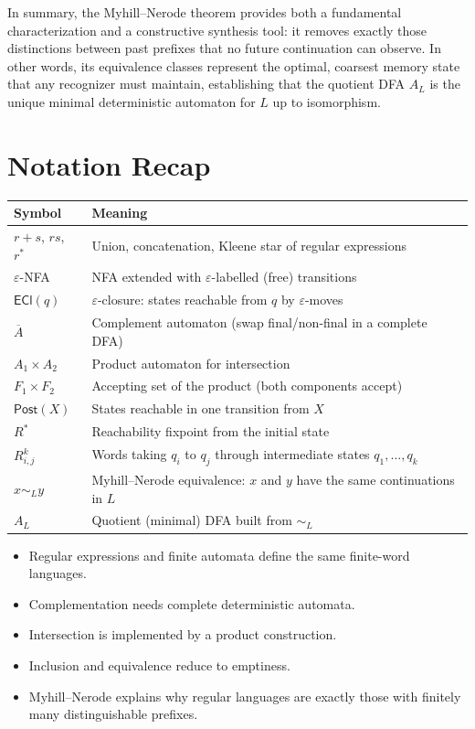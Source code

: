 \medskip\noindent
In summary, the Myhill--Nerode theorem provides both a fundamental characterization and a constructive synthesis tool: it removes exactly those distinctions between past prefixes that no future continuation can observe. In other words, its equivalence classes represent the optimal, coarsest memory state that any recognizer must maintain, establishing that the quotient DFA $A_L$ is the unique minimal deterministic automaton for $L$ up to isomorphism.

\section*{Notation Recap}

\begin{center}
\begin{tabular}{@{}ll@{}}
\toprule
Symbol & Meaning \\
\midrule
$r+s$, $rs$, $r^*$ & Union, concatenation, Kleene star of regular expressions \\
$\varepsilon$-NFA & NFA extended with $\varepsilon$-labelled (free) transitions \\
$\mathsf{ECl}(q)$ & $\varepsilon$-closure: states reachable from $q$ by $\varepsilon$-moves \\
$\overline{A}$ & Complement automaton (swap final/non-final in a complete DFA) \\
$A_1\times A_2$ & Product automaton for intersection \\
$F_1\times F_2$ & Accepting set of the product (both components accept) \\
$\mathsf{Post}(X)$ & States reachable in one transition from $X$ \\
$R^*$ & Reachability fixpoint from the initial state \\
$R_{i,j}^k$ & Words taking $q_i$ to $q_j$ through intermediate states $q_1,\ldots,q_k$ \\
$x\sim_L y$ & Myhill--Nerode equivalence: $x$ and $y$ have the same continuations in $L$ \\
$A_L$ & Quotient (minimal) DFA built from $\sim_L$ \\
\bottomrule
\end{tabular}
\end{center}

\begin{summarybox}
\begin{itemize}[nosep]
  \item Regular expressions and finite automata define the same finite-word languages.
  \item Complementation needs complete deterministic automata.
  \item Intersection is implemented by a product construction.
  \item Inclusion and equivalence reduce to emptiness.
  \item Myhill--Nerode explains why regular languages are exactly those with finitely many distinguishable prefixes.
\end{itemize}
\end{summarybox}

